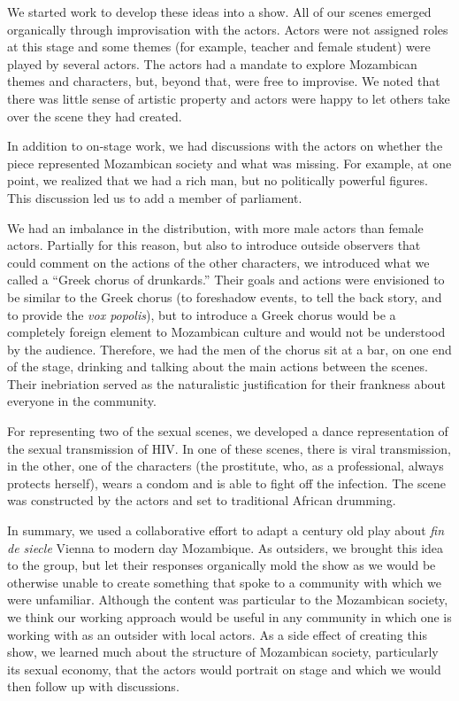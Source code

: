 \documentclass[article,twocolumn,twoside]{memoir}
\begin{document}
We started work to develop these ideas into a show. All of our scenes emerged
organically through improvisation with the actors. Actors were not assigned
roles at this stage and some themes (for example, teacher and female student)
were played by several actors. The actors had a mandate to explore Mozambican
themes and characters, but, beyond that, were free to improvise. We noted that
there was little sense of artistic property and actors were happy to let others
take over the scene they had created.

In addition to on-stage work, we had discussions with the actors on whether the
piece represented Mozambican society and what was missing. For example, at one
point, we realized that we had a rich man, but no politically powerful figures.
This discussion led us to add a member of parliament.

We had an imbalance in the distribution, with more male actors than female
actors. Partially for this reason, but also to introduce outside observers that
could comment on the actions of the other characters, we introduced what we
called a ``Greek chorus of drunkards.'' Their goals and actions were envisioned
to be similar to the Greek chorus (to foreshadow events, to tell the back story,
and to provide the \textit{vox popolis}), but to introduce a Greek chorus would
be a completely foreign element to Mozambican culture and would not be
understood by the audience. Therefore, we had the men of the chorus sit at a
bar, on one end of the stage, drinking and talking about the main actions
between the scenes. Their inebriation served as the naturalistic justification
for their frankness about everyone in the community.

For representing two of the sexual scenes, we developed a dance representation
of the sexual transmission of HIV. In one of these scenes, there is viral
transmission, in the other, one of the characters (the prostitute, who, as a
professional, always protects herself), wears a condom and is able to fight off
the infection. The scene was constructed by the actors and set to traditional
African drumming.

\bigskip
\bigskip
\bigskip

In summary, we used a collaborative effort to adapt a century old play about
\textit{fin de siecle} Vienna to modern day Mozambique. As outsiders, we
brought this idea to the group, but let their responses organically mold the
show as we would be otherwise unable to create something that spoke to a
community with which we were unfamiliar. Although the content was particular to
the Mozambican society, we think our working approach would be useful in any
community in which one is working with as an outsider with local actors. As a
side effect of creating this show, we learned much about the structure of
Mozambican society, particularly its sexual economy, that the actors would
portrait on stage and which we would then follow up with discussions.
\end{document}
